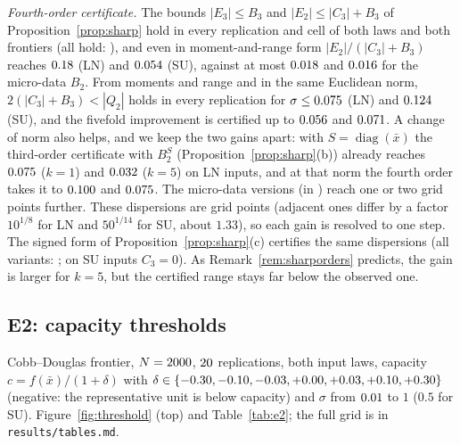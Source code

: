 \documentclass[10pt,a4paper]{article}
\theoremstyle{plain}
\theoremstyle{definition}
\theoremstyle{remark}
\begin{document}
\emph{Fourth-order certificate.} The bounds $|E_3|\le B_3$ and $|E_2|\le|C_3|+B_3$ of Proposition~\ref{prop:sharp} hold in every replication and cell of both laws and both frontiers (all hold: \SharpBoundsHold), and even in moment-and-range form $|E_2|/(|C_3|+B_3)$ reaches $0.18$ (LN) and $0.054$ (SU), against at most $0.018$ and $0.016$ for the micro-data $B_2$. From moments and range and in the same Euclidean norm, $2(|C_3|+B_3)<|Q_2|$ holds in every replication for $\sigma\le0.075$ (LN) and $0.124$ (SU), and the fivefold improvement is certified up to $0.056$ and $0.071$. A change of norm also helps, and we keep the two gains apart: with $S=\operatorname{diag}(\bar x)$ the third-order certificate with $B_2^S$ (Proposition~\ref{prop:sharp}(b)) already reaches $0.075$ ($k=1$) and $0.032$ ($k=5$) on LN inputs, and at that norm the fourth order takes it to $0.100$ and $0.075$. The micro-data versions (in ) reach one or two grid points further. These dispersions are grid points (adjacent ones differ by a factor $10^{1/8}$ for LN and $50^{1/14}$ for SU, about $1.33$), so each gain is resolved to one step. The signed form of Proposition~\ref{prop:sharp}(c) certifies the same dispersions (all variants: \SharpSignedSame; on SU inputs $C_3=0$). As Remark~\ref{rem:sharporders} predicts, the gain is larger for $k=5$, but the certified range stays far below the observed one.

\subsection{E2: capacity thresholds}

Cobb--Douglas frontier, $N=2000$, $20$ replications, both input laws, capacity $c=f(\bar x)/(1+\delta)$ with $\delta\in\{-0.30, -0.10, -0.03, +0.00, +0.03, +0.10, +0.30\}$ (negative: the representative unit is below capacity) and $\sigma$ from $0.01$ to $1$ ($0.5$ for SU). Figure~\ref{fig:threshold} (top) and Table~\ref{tab:e2}; the full grid is in \texttt{results/tables.md}.
\end{document}
